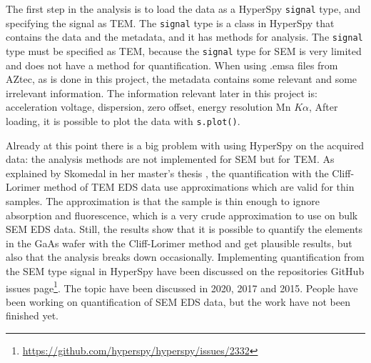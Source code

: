 The first step in the analysis is to load the data as a HyperSpy \verb|signal| type, and specifying the signal as TEM.
The \verb|signal| type is a class in HyperSpy that contains the data and the metadata, and it has methods for analysis.
The \verb|signal| type must be specified as TEM, because the \verb|signal| type for SEM is very limited and does not have a method for quantification.
When using .emsa files from AZtec, as is done in this project, the metadata contains some relevant and some irrelevant information.
The information relevant later in this project is:
acceleration voltage, dispersion, zero offset, energy resolution Mn $K\alpha$,
After loading, it is possible to plot the data with \verb|s.plot()|.

Already at this point there is a big problem with using HyperSpy on the acquired data: the analysis methods are not implemented for SEM but for TEM.
As explained by Skomedal in her master's thesis \cite{skomedal_improving_2022}, the quantification with the Cliff-Lorimer method of TEM EDS data use approximations which are valid for thin samples.
The approximation is that the sample is thin enough to ignore absorption and fluorescence, which is a very crude approximation to use on bulk SEM EDS data.
Still, the results show that it is possible to quantify the elements in the GaAs wafer with the Cliff-Lorimer method and get plausible results, but also that the analysis breaks down occasionally. %
Implementing quantification from the SEM type signal in HyperSpy have been discussed on the repositories GitHub issues page\footnote{\url{https://github.com/hyperspy/hyperspy/issues/2332}}.
The topic have been discussed in 2020, 2017 and 2015.
People have been working on quantification of SEM EDS data, but the work have not been finished yet.

